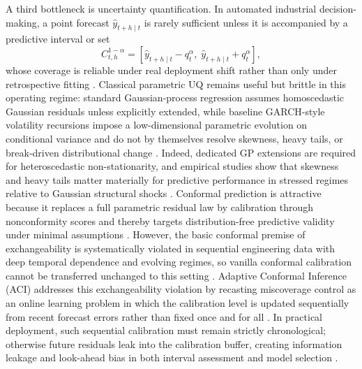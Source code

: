 \documentclass[review,number,sort&compress]{elsarticle}
\begin{document}
A third bottleneck is uncertainty quantification. In automated industrial decision-making, a point forecast $\hat{y}_{t+h \mid t}$ is rarely sufficient unless it is accompanied by a predictive interval or set
\[
C_{t,h}^{1-\alpha} = \left[\hat{y}_{t+h \mid t} - q_t^\alpha,\; \hat{y}_{t+h \mid t} + q_t^\alpha\right],
\]
whose coverage is reliable under real deployment shift rather than only under retrospective fitting \cite{angelopoulos2023conformal}. Classical parametric UQ remains useful but brittle in this operating regime: standard Gaussian-process regression assumes homoscedastic Gaussian residuals unless explicitly extended, while baseline GARCH-style volatility recursions impose a low-dimensional parametric evolution on conditional variance and do not by themselves resolve skewness, heavy tails, or break-driven distributional change \cite{wang2012gp,bollerslev1986garch}. Indeed, dedicated GP extensions are required for heteroscedastic non-stationarity, and empirical studies show that skewness and heavy tails matter materially for predictive performance in stressed regimes relative to Gaussian structural shocks \cite{tolvanen2014gp,karlsson2021skewvar}. Conformal prediction is attractive because it replaces a full parametric residual law by calibration through nonconformity scores and thereby targets distribution-free predictive validity under minimal assumptions \cite{shafer2008tutorial}. However, the basic conformal premise of exchangeability is systematically violated in sequential engineering data with deep temporal dependence and evolving regimes, so vanilla conformal calibration cannot be transferred unchanged to this setting \cite{zaffran2022adaptive,xu2023spci}. Adaptive Conformal Inference (ACI) addresses this exchangeability violation by recasting miscoverage control as an online learning problem in which the calibration level is updated sequentially from recent forecast errors rather than fixed once and for all \cite{gibbs2021aci,gibbs2024online}. In practical deployment, such sequential calibration must remain strictly chronological; otherwise future residuals leak into the calibration buffer, creating information leakage and look-ahead bias in both interval assessment and model selection \cite{cerqueira2020evaluation,burkner2020lfo}.
\end{document}
